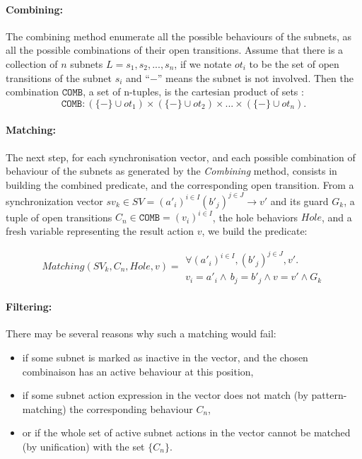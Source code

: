 \documentclass{lncs/llncs}
\begin{document}
\def\inactive{\{-\}}
\paragraph{Combining:}
The combining method enumerate all the possible behaviours of the
subnets, as all the possible combinations of their open transitions.
Assume that there is a collection of $n$ subnets $L = {s_1, s_2, ...,
  s_n}$, if we notate $ot_i$ to be the set of open transitions of the
subnet $s_i$ and ``$-$'' means the subnet is not involved.  
Then the combination $\texttt{COMB}$, a set of n-tuples, is the
cartesian product of sets :  
\[\texttt{COMB} : (\inactive\cup ot_1) \times (\inactive\cup ot_2)\times ... \times (\inactive\cup ot_n) .\]




\paragraph{Matching:}
The next step, for each synchronisation vector, and each possible
combination of behaviour of the subnets as generated by the \emph
{Combining} method, consists in building the combined predicate,
and the corresponding open transition.
From a synchronization vector
$sv_k\in SV = (a'_i)^{i\in I} (b'_j)^{j\in J}\rightarrow v'$
and its guard $G_k$, a tuple of open transitions
$C_n\in \texttt{COMB} = {(v_i)}^{i\in I}$, the hole behaviors $Hole$,
and a fresh variable representing the result action $v$, we build the
predicate: 

$$Matching(SV_k, C_n, Hole, v) = 
\begin{array}{l}
\forall {(a'_i)}^{i\in I},
{(b'_j)}^{j\in J},v'.
\\
v_i=a'_i\land \, b_j=b'_j \land v=v' \land G_k
\end{array}$$

\paragraph{Filtering:}
There may be several reasons why such a matching would fail:
\begin{itemize}
  \item if some subnet is marked as inactive in the vector, and the
    chosen combinaison has an active behaviour at this position,
  \item if some subnet action expression in the vector does not match (by
    pattern-matching) the corresponding behaviour $C_n$,
  \item or if the whole set of active subnet actions in the vector
    cannot be matched (by unification) with the set $\{C_n\}$.
\end {itemize}
\end{document}
